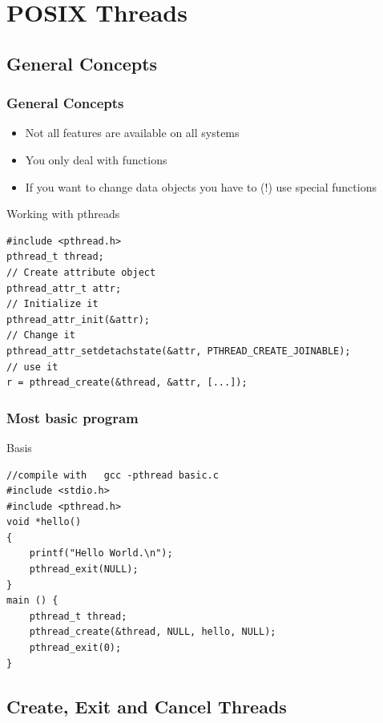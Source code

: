 \documentclass[10pt]{beamer}
\begin{document}
\section{POSIX Threads}

\subsection{General Concepts}
\begin{frame}[fragile]
\frametitle{General Concepts}
\begin{itemize}
        \item Not all features are available on all systems
        \item You only deal with functions
        \item If you want to change data objects you have to (!) use special functions
\end{itemize}

\begin{block}{Working with pthreads}
\begin{lstlisting}
#include <pthread.h>
pthread_t thread;
// Create attribute object
pthread_attr_t attr;
// Initialize it
pthread_attr_init(&attr);
// Change it
pthread_attr_setdetachstate(&attr, PTHREAD_CREATE_JOINABLE);
// use it
r = pthread_create(&thread, &attr, [...]);
\end{lstlisting}
\end{block}
\end{frame}


\begin{frame}[fragile]
	\frametitle{Most basic program}
\begin{block}{Basis}
\begin{lstlisting}
//compile with   gcc -pthread basic.c
#include <stdio.h>
#include <pthread.h>
void *hello()
{
    printf("Hello World.\n");
    pthread_exit(NULL);
}
main () {
    pthread_t thread;
    pthread_create(&thread, NULL, hello, NULL);
    pthread_exit(0);
}
\end{lstlisting}
\end{block}
\end{frame}

\subsection{Create, Exit and Cancel Threads}
\end{document}
